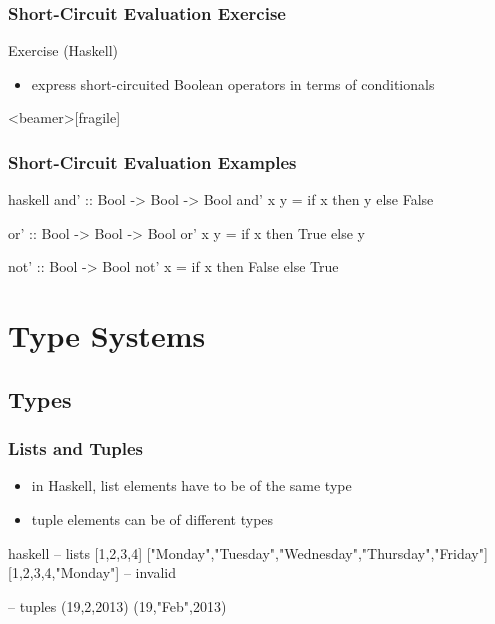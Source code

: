 \documentclass[dvipsnames]{beamer}
\theoremstyle{plain}
\begin{document}
\begin{frame}
  \frametitle{Short-Circuit Evaluation Exercise}

  \begin{block}{Exercise (Haskell)}
    \begin{itemize}
      \item express short-circuited Boolean operators in terms of conditionals
    \end{itemize}
  \end{block}
\end{frame}

\begin{frame}<beamer>[fragile]
  \frametitle{Short-Circuit Evaluation Examples}

  \begin{example}[Haskell]
    \begin{pygments}{haskell}
and' :: Bool -> Bool -> Bool
and' x y = if x then y else False

or' :: Bool -> Bool -> Bool
or' x y = if x then True else y

not' :: Bool -> Bool
not' x = if x then False else True
    \end{pygments}
  \end{example}
\end{frame}

\section{Type Systems}

\subsection{Types}

\begin{frame}[fragile]
  \frametitle{Lists and Tuples}

  \begin{itemize}
    \item in Haskell, list elements have to be of the same type
    \item tuple elements can be of different types
  \end{itemize}

  \begin{example}[Haskell]
    \begin{pygments}{haskell}
-- lists
[1,2,3,4]
["Monday","Tuesday","Wednesday","Thursday","Friday"]
[1,2,3,4,"Monday"]      -- invalid

-- tuples
(19,2,2013)
(19,"Feb",2013)
    \end{pygments}
  \end{example}
\end{frame}
\end{document}
